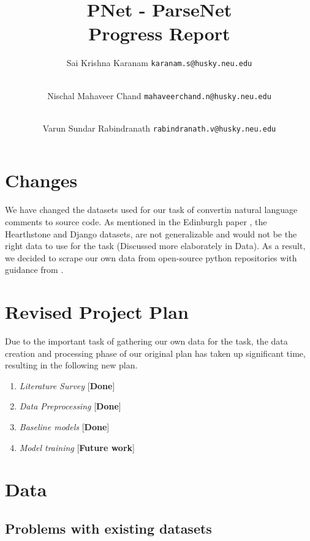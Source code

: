 \documentclass{IEEEtran}
\title{\textbf{PNet - ParseNet \\ \large{Progress Report}}}
\author{
    Sai Krishna Karanam 
    \texttt{karanam.s@husky.neu.edu}
    \and \\
    Nischal Mahaveer Chand 
    \texttt{mahaveerchand.n@husky.neu.edu}
    \and \\
    Varun Sundar Rabindranath 
    \texttt{rabindranath.v@husky.neu.edu}
}
\date{}
\begin{document}
    \maketitle

    \section{Changes}

    We have changed the datasets used for our task of convertin natural language comments to 
    source code. As mentioned in the Edinburgh paper \cite{barone2017}, the Hearthstone and 
    Django datasets, are not generalizable and would not be the right data to use for the task 
    (Discussed more elaborately in Data). As a result, we decided to scrape our own data from 
    open-source python repositories with guidance from \cite{barone2017}.

    \section{Revised Project Plan}
    Due to the important task of gathering our own data for the task, the data creation and 
    processing phase of our original plan has taken up significant time, resulting in the
    following new plan.
    \begin{enumerate}
        \item \textit{Literature Survey} \hfill [\textbf{Done}]
        \item \textit{Data Preprocessing} \hfill [\textbf{Done}]
        \item \textit{Baseline models} \hfill [\textbf{Done}]
        \item \textit{Model training} \hfill [\textbf{Future work}]
    \end{enumerate}

    \section{Data}

      \subsection{Problems with existing datasets}
\end{document}
